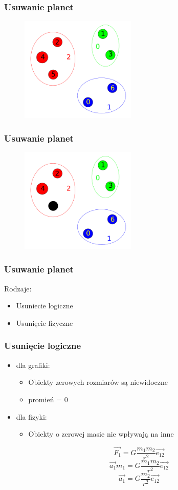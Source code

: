 \documentclass{beamer}
\begin{document}
\frame
{
	\frametitle{Usuwanie planet}
	\begin{figure}
		\centering
		\includegraphics[height=5cm]{img/clusters.pdf}
	\end{figure}
	\setcounter{subfigure}{0}
}

\frame
{
	\frametitle{Usuwanie planet}
	\begin{figure}
		\centering
		\includegraphics[height=5cm]{img/clusters2.pdf}
	\end{figure}
	\setcounter{subfigure}{0}
}

\frame
{
	\frametitle{Usuwanie planet}
	Rodzaje:
	\begin{itemize}
	\item Usuniecie logiczne
	\item Usunięcie fizyczne
	\end{itemize}
}

\frame
{
	\frametitle{Usunięcie logiczne}
	\begin{itemize}
		\item dla grafiki:
		\begin{itemize}
			\item{Obiekty zerowych rozmiarów są niewidoczne}
			\item{promień = 0}
		\end{itemize}
		\item dla fizyki:
		\begin{itemize}
			\item{Obiekty o zerowej masie nie wpływają na inne}
		\end{itemize}
		\hspace{0.6cm}
		$$ \overrightarrow{F_1} = G\frac{m_1 m_2}{r^2}\overrightarrow{e_{12}}  $$
		$$ \overrightarrow{a_1}m_1 = G\frac{m_1 m_2}{r^2}\overrightarrow{e_{12}}  $$
		$$ \overrightarrow{a_1} = G\frac{m_2}{r^2}\overrightarrow{e_{12}}  $$
	\end{itemize}
}
\end{document}
